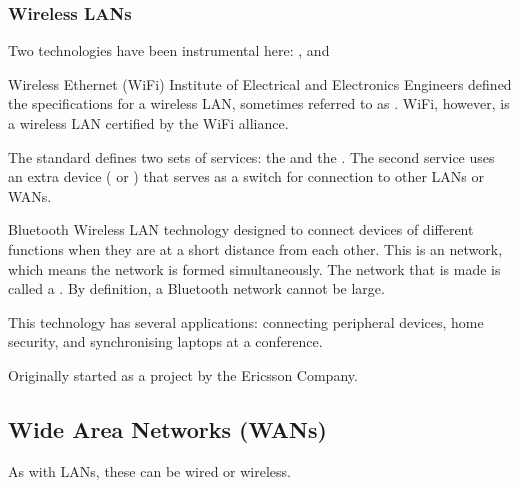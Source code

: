 \documentclass[\main/notes.tex]{subfiles}
\begin{document}
				\subsubsection{Wireless LANs}
					Two technologies have been instrumental here: , and 
					\begin{definition}{Wireless Ethernet (WiFi)}
						Institute of Electrical and Electronics Engineers defined the specifications for a wireless LAN, sometimes referred to as . WiFi, however, is a wireless LAN certified by the WiFi alliance.

						The standard defines two sets of services: the  and the . The second service uses an extra device ( or ) that serves as a switch for connection to other LANs or WANs.
					\end{definition}
					\begin{definition}{Bluetooth}
						Wireless LAN technology designed to connect devices of different functions when they are at a short distance from each other. This is an  network, which means the network is formed simultaneously. The network that is made is called a . By definition, a Bluetooth network cannot be large.

						This technology has several applications: connecting peripheral devices, home security, and synchronising laptops at a conference.

						Originally started as a project by the Ericsson Company.
					\end{definition}
			\pagebreak
			\subsection{Wide Area Networks (WANs)}
				As with LANs, these can be wired or wireless.
\end{document}
